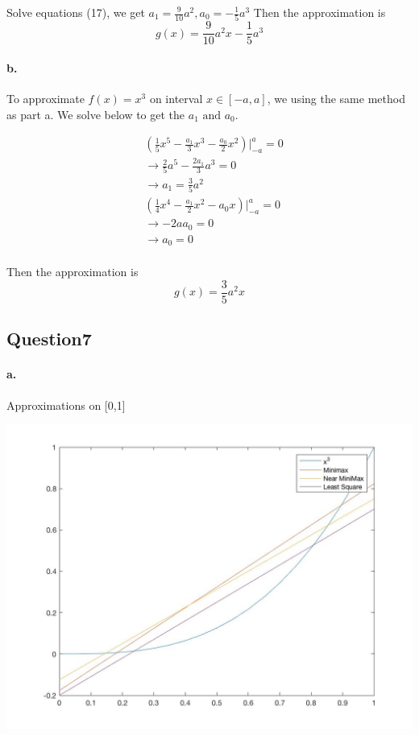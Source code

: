 \documentclass{article}
\begin{document}
Solve equations (17), we get $a_1 = \frac{9}{10} a^2, a_0 = - \frac{1}{5} a^3$
Then the approximation is $$g(x) = \frac{9}{10} a^2x -  \frac{1}{5} a^3 $$

\paragraph{b.} To approximate $f(x) = x^3$ on interval $x \in [-a,a]$, we using the same method as part a.
We solve below to get the $ a_1 \text{ and } a_0$.

\begin{equation}
  \begin{split}
     & (\frac{1}{5} x^5 - \frac{a_1}{3} x ^3 - \frac{a_0}{2} x^2) \vert^{a}_{-a} =0\\
     & \rightarrow  \frac{2}{5} a^5 - \frac{2 a_1}{3} a^3 = 0 \\
     & \rightarrow  a_1 = \frac{3}{5} a^2  \\
     & (\frac{1}{4} x^4 - \frac{a_1}{2} x^2 - a_0 x) \vert^{a}_{-a} = 0\\
     & \rightarrow - 2 a a_0  = 0\\
     & \rightarrow a_0  = 0\\
  \end{split}
\end{equation}

Then the approximation is $$g(x) = \frac{3}{5} a^2x  $$

\subsection*{Question7}

\paragraph{a. } Approximations on [0,1]

\includegraphics[width=\textwidth]{7a}
\end{document}
